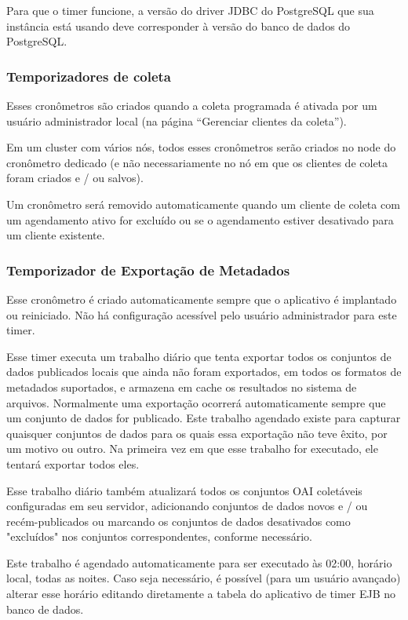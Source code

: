 \documentclass[12pt,hidelinks]{article}
\begin{document}
Para que o timer funcione, a versão do driver JDBC do PostgreSQL que sua instância está usando deve corresponder à versão do banco de dados do PostgreSQL.

\subsubsection{Temporizadores de coleta}

\qquad Esses cronômetros são criados quando a coleta programada é ativada por um usuário administrador local (na página “Gerenciar clientes da coleta”).

Em um cluster com vários nós, todos esses cronômetros serão criados no node do cronômetro dedicado (e não necessariamente no nó em que os clientes de coleta foram criados e / ou salvos).

Um cronômetro será removido automaticamente quando um cliente de coleta com um agendamento ativo for excluído ou se o agendamento estiver desativado para um cliente existente.

\subsubsection{Temporizador de Exportação de Metadados}

\qquad Esse cronômetro é criado automaticamente sempre que o aplicativo é implantado ou reiniciado.
Não há configuração acessível pelo usuário administrador para este timer.

Esse timer executa um trabalho diário que tenta exportar todos os conjuntos de dados publicados locais que ainda não foram exportados, em todos os formatos de metadados suportados, e armazena em cache os resultados no sistema de arquivos. Normalmente uma exportação ocorrerá automaticamente sempre que um conjunto de dados for publicado. Este trabalho agendado existe para capturar quaisquer conjuntos de dados para os quais essa exportação não teve êxito, por um motivo ou outro. Na primeira vez em que esse trabalho for executado, ele tentará exportar todos eles.

Esse trabalho diário também atualizará todos os conjuntos OAI coletáveis configuradas em seu servidor, adicionando conjuntos de dados novos e / ou recém-publicados ou marcando os conjuntos de dados desativados como "excluídos" nos conjuntos correspondentes, conforme necessário.

Este trabalho é agendado automaticamente para ser executado às 02:00, horário local, todas as noites. Caso seja necessário, é possível (para um usuário avançado) alterar esse horário editando diretamente a tabela do aplicativo de timer EJB no banco de dados.
\end{document}
